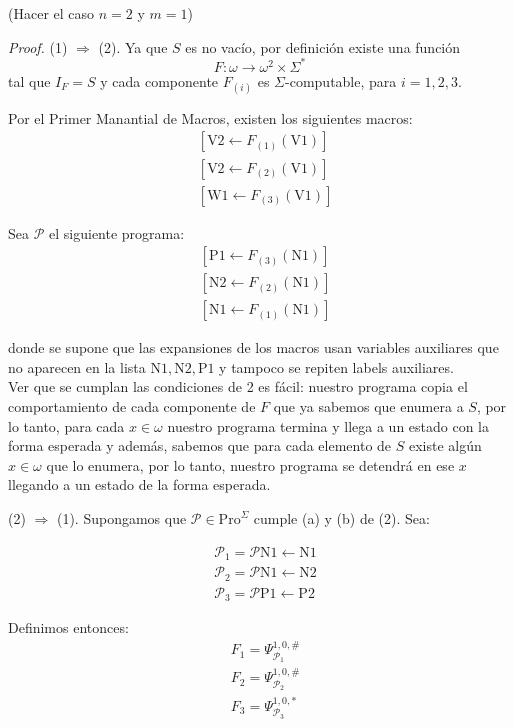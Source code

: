 \documentclass{article}
\begin{document}
\medskip

(Hacer el caso $n = 2$ y $m = 1$)
\medskip

\textit{Proof.} (1) $\Rightarrow$ (2). Ya que $S$ es no vacío, por definición existe una función 
\[
F : \omega \to \omega^2 \times \Sigma^*
\]
tal que $I_F = S$ y cada componente $F_{(i)}$ es $\Sigma$-computable, para $i = 1, 2, 3$.

Por el Primer Manantial de Macros, existen los siguientes macros:
\[
\begin{aligned}
&[\text{V2} \leftarrow F_{(1)}(\text{V1})] \\
&[\text{V2} \leftarrow F_{(2)}(\text{V1})] \\
&[\text{W1} \leftarrow F_{(3)}(\text{V1})]
\end{aligned}
\]

Sea $\mathcal{P}$ el siguiente programa:
\[
\begin{aligned}
&[\text{P}1 \leftarrow F_{(3)}(\text{N1})] \\
&[\text{N2} \leftarrow F_{(2)}(\text{N1})] \\
&[\text{N1} \leftarrow F_{(1)}(\text{N1})]
\end{aligned}
\]

donde se supone que las expansiones de los macros usan variables auxiliares que no aparecen en la lista $\text{N1}, \text{N2}, \text{P1}$ y tampoco se repiten labels auxiliares.\\
Ver que se cumplan las condiciones de 2 es fácil: nuestro programa copia el comportamiento de cada componente de $F$ que ya sabemos que enumera a $S$, por lo tanto, para cada $x\in \omega$ nuestro programa termina y llega a un estado con la forma esperada y además, sabemos que para cada elemento de $S$ existe algún $x \in \omega$ que lo enumera, por lo tanto, nuestro programa se detendrá en ese $x$ llegando a un estado de la forma esperada. 
\medskip

(2) $\Rightarrow$ (1). Supongamos que $\mathcal{P} \in \text{Pro}^\Sigma$ cumple (a) y (b) de (2). Sea:

\[
\begin{aligned}
&\mathcal{P}_1 = \mathcal{P} \text{N1} \leftarrow \text{N1} \\
&\mathcal{P}_2 = \mathcal{P} \text{N1} \leftarrow \text{N2} \\
&\mathcal{P}_3 = \mathcal{P}\text{P1} \leftarrow \text{P2}
\end{aligned}
\]

Definimos entonces:
\[
\begin{aligned}
&F_1 = \Psi^{1,0,\#}_{\mathcal{P}_1} \\
&F_2 = \Psi^{1,0,\#}_{\mathcal{P}_2} \\
&F_3 = \Psi^{1,0,*}_{\mathcal{P}_3}
\end{aligned}
\]
\end{document}

